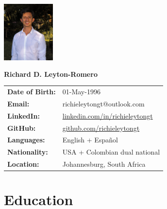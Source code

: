 \documentclass[12pt,letterpaper]{article} %
\begin{document}
\hfill{\includegraphics[width = 0.2\textwidth]{Headshot.jpg}}

\vspace{-120pt}
\textbf{\large Richard D. Leyton-Romero} \\

\vspace{5pt} %



\begin{tabular}{l l}
    \textbf{Date of Birth:} & 01-May-1996 \\
    \textbf{Email:} & richieleytongt@outlook.com \\
    \textbf{LinkedIn:} & \href{https://www.linkedin.com/in/richieleytongt/}{linkedin.com/in/richieleytongt} \\
    \textbf{GitHub:} & \href{https://github.com/richieleytongt}{github.com/richieleytongt} \\
    \textbf{Languages:} & English + Español \\
    \textbf{Nationality:} & USA + Colombian dual national \\
    \textbf{Location:} & Johannesburg, South Africa \\
    \end{tabular}

\vspace{-10pt} %

\section*{Education}
\end{document}

